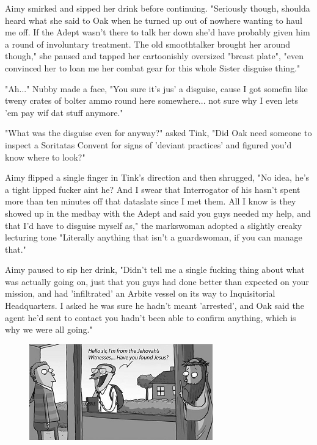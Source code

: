 Aimy smirked and sipped her drink before continuing. 
"Seriously though, shoulda heard what she said to Oak when he turned up out of nowhere wanting to haul me off. 
If the Adept wasn't there to talk her down she'd have probably given him a round of involuntary treatment. 
The old smoothtalker brought her around though," she paused and tapped her cartoonishly oversized "breast plate", "even convinced her to loan me her combat gear for this whole Sister disguise thing."

"Ah..." Nubby made a face, "You sure it's jus' a disguise, cause I got somefin like tweny crates of bolter ammo round here somewhere... 
not sure why I even lets 'em pay wif dat stuff anymore."

"What was the disguise even for anyway?" asked Tink, "Did Oak need someone to inspect a Soritatas Convent for signs of 'deviant practices' and figured you'd know where to look?"

Aimy flipped a single finger in Tink's direction and then shrugged, "No idea, he's a tight lipped fucker aint he? 
And I swear that Interrogator of his hasn't spent more than ten minutes off that dataslate since I met them. 
All I know is they showed up in the medbay with the Adept and said you guys needed my help, and that I'd have to disguise myself as," the markswoman adopted a slightly creaky lecturing tone "Literally anything that isn't a guardswoman, if you can manage that."

Aimy paused to sip her drink, "Didn't tell me a single fucking thing about what was actually going on, just that you guys had done better than expected on your mission, and had 'infiltrated' an Arbite vessel on its way to Inquisitorial Headquarters. 
I asked he was sure he hadn't meant 'arrested', and Oak said the agent he'd sent to contact you hadn't been able to confirm anything, which is why we were all going."


\begin{figure}
	\begin{center}
		\includegraphics[width=\figwidth]{pics/20/14.png}
	\end{center}
\end{figure}

